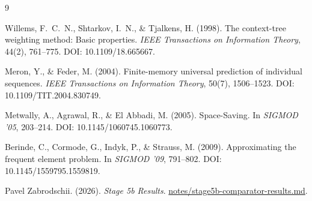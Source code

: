 \documentclass[11pt]{article}
\begin{document}
\begin{thebibliography}{9}

Willems, F.~C.~N., Shtarkov, I.~N., \& Tjalkens, H. (1998). 
\newblock The context-tree weighting method: Basic properties. 
\newblock \emph{IEEE Transactions on Information Theory}, 44(2), 761--775. 
\newblock DOI: 10.1109/18.665667.

Meron, Y., \& Feder, M. (2004). 
\newblock Finite-memory universal prediction of individual sequences. 
\newblock \emph{IEEE Transactions on Information Theory}, 50(7), 1506--1523. 
\newblock DOI: 10.1109/TIT.2004.830749.

Metwally, A., Agrawal, R., \& El Abbadi, M. (2005). 
\newblock Space-Saving. 
\newblock In \emph{SIGMOD '05}, 203--214. DOI: 10.1145/1060745.1060773.

Berinde, C., Cormode, G., Indyk, P., \& Strauss, M. (2009). 
\newblock Approximating the frequent element problem. 
\newblock In \emph{SIGMOD '09}, 791--802. DOI: 10.1145/1559795.1559819.

Pavel Zabrodschii. (2026). 
\newblock \emph{Stage 5b Results}. 
\newblock \url{notes/stage5b-comparator-results.md}.

\end{thebibliography}
\end{document}
